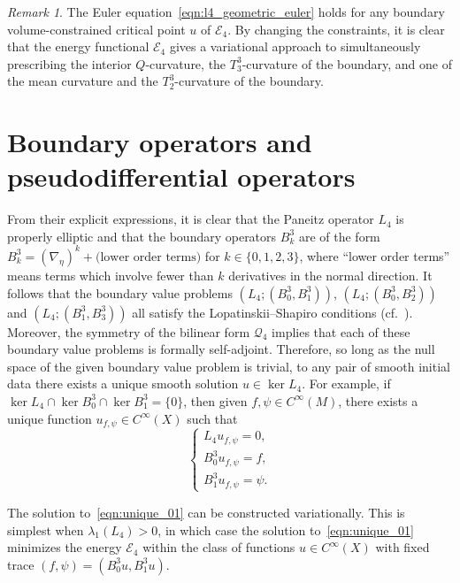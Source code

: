 \documentclass{amsart}
\theoremstyle{definition}
\theoremstyle{remark}
\newtheorem{remark}[thm]{Remark}
\numberwithin{equation}{section}
\begin{document}
\begin{remark}
 The Euler equation~\eqref{eqn:l4_geometric_euler} holds for any boundary volume-constrained critical point $u$ of ${\mathcal{E}}_4$.  By changing the constraints, it is clear that the energy functional ${\mathcal{E}}_4$ gives a variational approach to simultaneously prescribing the interior $Q$-curvature, the $T_3^3$-curvature of the boundary, and one of the mean curvature and the $T_2^3$-curvature of the boundary.
\end{remark}

\section{Boundary operators and pseudodifferential operators}
\label{sec:asymptotics}

From their explicit expressions, it is clear that the Paneitz operator $L_4$ is properly elliptic and that the boundary operators $B_k^3$ are of the form $B_k^3=(\nabla_\eta)^k + \text{(lower order terms)}$ for $k\in\{0,1,2,3\}$, where ``lower order terms'' means terms which involve fewer than $k$ derivatives in the normal direction.  It follows that the boundary value problems $(L_4;(B_0^3,B_1^3))$, $(L_4;(B_0^3,B_2^3))$ and $(L_4;(B_1^3,B_3^3))$ all satisfy the Lopatinskii--Shapiro conditions (cf.\ \cite{AgmonDouglisNirenberg1964,BransonGover2001}).  Moreover, the symmetry of the bilinear form ${\mathcal{Q}}_4$ implies that each of these boundary value problems is formally self-adjoint.  Therefore, so long as the null space of the given boundary value problem is trivial, to any pair of smooth initial data there exists a unique smooth solution $u\in\ker L_4$.  For example, if $\ker L_4\cap \ker B_0^3 \cap \ker B_1^3 = \{0\}$, then given $f,\psi\in C^\infty(M)$, there exists a unique function $u_{f,\psi}\in C^\infty(X)$ such that
\begin{equation}
 \label{eqn:unique_01}
 \begin{cases}
  L_4u_{f,\psi} = 0, \\
  B_0^3u_{f,\psi} = f, \\
  B_1^3u_{f,\psi} = \psi .
 \end{cases}
\end{equation}

The solution to~\eqref{eqn:unique_01} can be constructed variationally.  This is simplest when $\lambda_1(L_4)>0$, in which case the solution to~\eqref{eqn:unique_01} minimizes the energy ${\mathcal{E}}_4$ within the class of functions $u\in C^\infty(X)$ with fixed trace $(f,\psi)=(B_0^3u,B_1^3u)$.
\end{document}
